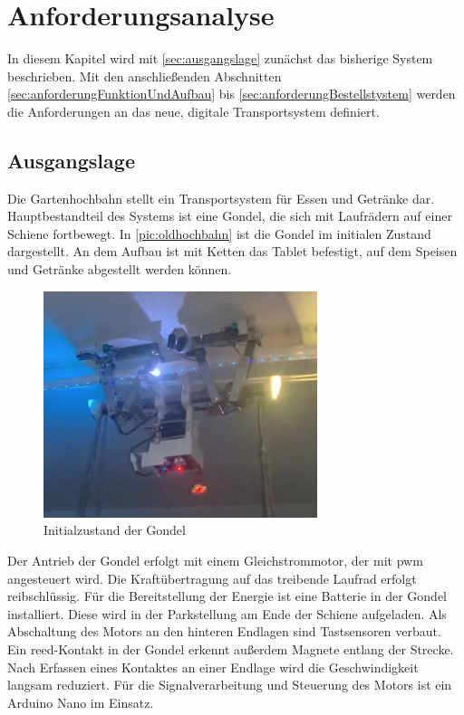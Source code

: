 \chapter{Anforderungsanalyse}
\label{cha:anforderungsanalyse}

In diesem Kapitel wird mit \autoref{sec:ausgangslage} zunächst das bisherige System beschrieben. Mit den anschließenden Abschnitten \ref{sec:anforderungFunktionUndAufbau} bis \ref{sec:anforderungBestellstystem} werden die Anforderungen an das neue, digitale Transportsystem definiert. 

\section{Ausgangslage}
\label{sec:ausgangslage}
Die Gartenhochbahn stellt ein Transportsystem für Essen und Getränke dar. Hauptbestandteil des Systems ist eine Gondel, die sich mit Laufrädern auf einer Schiene fortbewegt. In \autoref{pic:oldhochbahn} ist die Gondel im initialen Zustand dargestellt. An dem Aufbau ist mit Ketten das Tablet befestigt, auf dem Speisen und Getränke abgestellt werden können.  

\begin{figure}[h]
	\begin{center}
		\includegraphics[width=8cm]{oldHochbahn.png}
		\caption{Initialzustand der Gondel}
		\label{pic:oldhochbahn}
	\end{center}
\end{figure}
\newpage

Der Antrieb der Gondel erfolgt mit einem Gleichstrommotor, der mit \acrfull{pwm} angesteuert wird. Die Kraftübertragung auf das treibende Laufrad erfolgt reibschlüssig. Für die Bereitstellung der Energie ist eine Batterie in der Gondel installiert. Diese wird in der Parkstellung am Ende der Schiene aufgeladen. Als Abschaltung des Motors an den hinteren Endlagen sind Tastsensoren verbaut. Ein \acrshort{reed}-Kontakt in der Gondel erkennt außerdem Magnete entlang der Strecke. Nach Erfassen eines Kontaktes an einer Endlage wird die Geschwindigkeit langsam reduziert. Für die Signalverarbeitung und Steuerung des Motors ist ein Arduino Nano im Einsatz. \\

